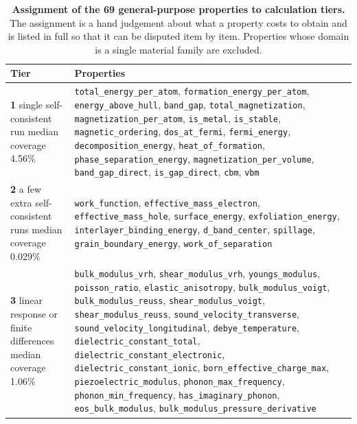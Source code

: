 \begin{table}[htbp]
\centering\footnotesize
\caption{\textbf{Assignment of the 69 general-purpose properties to calculation tiers.} The assignment is a hand judgement about what a property costs to obtain and is listed in full so that it can be disputed item by item. Properties whose domain is a single material family are excluded.}
\label{tab:tiers}
\begin{tabular}{p{}p{}}
\toprule
Tier & Properties \\
\midrule
\textbf{1} single self-consistent run \newline median coverage 4.56\% & \texttt{total\_energy\_per\_atom}, \texttt{formation\_energy\_per\_atom}, \texttt{energy\_above\_hull}, \texttt{band\_gap}, \texttt{total\_magnetization}, \texttt{magnetization\_per\_atom}, \texttt{is\_metal}, \texttt{is\_stable}, \texttt{magnetic\_ordering}, \texttt{dos\_at\_fermi}, \texttt{fermi\_energy}, \texttt{decomposition\_energy}, \texttt{heat\_of\_formation}, \texttt{phase\_separation\_energy}, \texttt{magnetization\_per\_volume}, \texttt{band\_gap\_direct}, \texttt{is\_gap\_direct}, \texttt{cbm}, \texttt{vbm} \\
\addlinespace[3pt]
\textbf{2} a few extra self-consistent runs \newline median coverage 0.029\% & \texttt{work\_function}, \texttt{effective\_mass\_electron}, \texttt{effective\_mass\_hole}, \texttt{surface\_energy}, \texttt{exfoliation\_energy}, \texttt{interlayer\_binding\_energy}, \texttt{d\_band\_center}, \texttt{spillage}, \texttt{grain\_boundary\_energy}, \texttt{work\_of\_separation} \\
\addlinespace[3pt]
\textbf{3} linear response or finite differences \newline median coverage 1.06\% & \texttt{bulk\_modulus\_vrh}, \texttt{shear\_modulus\_vrh}, \texttt{youngs\_modulus}, \texttt{poisson\_ratio}, \texttt{elastic\_anisotropy}, \texttt{bulk\_modulus\_voigt}, \texttt{bulk\_modulus\_reuss}, \texttt{shear\_modulus\_voigt}, \texttt{shear\_modulus\_reuss}, \texttt{sound\_velocity\_transverse}, \texttt{sound\_velocity\_longitudinal}, \texttt{debye\_temperature}, \texttt{dielectric\_constant\_total}, \texttt{dielectric\_constant\_electronic}, \texttt{dielectric\_constant\_ionic}, \texttt{born\_effective\_charge\_max}, \texttt{piezoelectric\_modulus}, \texttt{phonon\_max\_frequency}, \texttt{phonon\_min\_frequency}, \texttt{has\_imaginary\_phonon}, \texttt{eos\_bulk\_modulus}, \texttt{bulk\_modulus\_pressure\_derivative} \\

\end{tabular}
\end{table}
